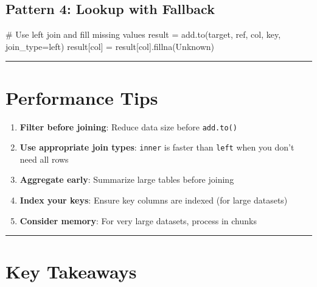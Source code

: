 \documentclass[
  letterpaper,
]{scrbook}
\newenvironment{Shaded}{\begin{snugshade}}{\end{snugshade}}
\newcommand{\CommentTok}[1]{\textcolor[rgb]{0.37,0.37,0.37}{#1}}
\newcommand{\NormalTok}[1]{\textcolor[rgb]{0.00,0.23,0.31}{#1}}
\newcommand{\OperatorTok}[1]{\textcolor[rgb]{0.37,0.37,0.37}{#1}}
\newcommand{\StringTok}[1]{\textcolor[rgb]{0.13,0.47,0.30}{#1}}
\providecommand{\tightlist}{%
  \setlength{\itemsep}{0pt}\setlength{\parskip}{0pt}}
\begin{document}
\subsection{Pattern 4: Lookup with
Fallback}\label{pattern-4-lookup-with-fallback}

\begin{Shaded}
\begin{Highlighting}[]
\CommentTok{\# Use left join and fill missing values}
\NormalTok{result }\OperatorTok{=}\NormalTok{ add.to(target, ref, }\StringTok{\textquotesingle{}col\textquotesingle{}}\NormalTok{, }\StringTok{\textquotesingle{}key\textquotesingle{}}\NormalTok{, join\_type}\OperatorTok{=}\StringTok{\textquotesingle{}left\textquotesingle{}}\NormalTok{)}
\NormalTok{result[}\StringTok{\textquotesingle{}col\textquotesingle{}}\NormalTok{] }\OperatorTok{=}\NormalTok{ result[}\StringTok{\textquotesingle{}col\textquotesingle{}}\NormalTok{].fillna(}\StringTok{\textquotesingle{}Unknown\textquotesingle{}}\NormalTok{)}
\end{Highlighting}
\end{Shaded}

\begin{center}\rule{0.5\linewidth}{0.5pt}\end{center}

\section{Performance Tips}\label{performance-tips}

\begin{enumerate}
\def\labelenumi{\arabic{enumi}.}
\tightlist
\item
  \textbf{Filter before joining}: Reduce data size before
  \texttt{add.to()}
\item
  \textbf{Use appropriate join types}: \texttt{inner} is faster than
  \texttt{left} when you don't need all rows
\item
  \textbf{Aggregate early}: Summarize large tables before joining
\item
  \textbf{Index your keys}: Ensure key columns are indexed (for large
  datasets)
\item
  \textbf{Consider memory}: For very large datasets, process in chunks
\end{enumerate}

\begin{center}\rule{0.5\linewidth}{0.5pt}\end{center}

\section{Key Takeaways}\label{key-takeaways-4}
\end{document}
